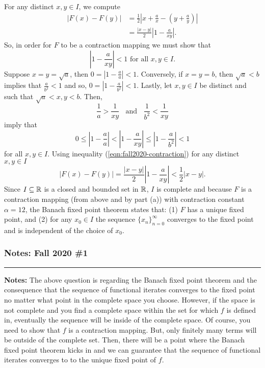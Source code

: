 \documentclass{article}
\begin{document}
For any distinct $x,y\in I$, we compute 
	\begin{align*}
		|F(x) - F(y)| & =\frac{1}{2} \left|x +\frac{a}{x} - \left(y +\frac{a}{y}\right)\right|\\
				  & = \frac{|x-y|}{2}\left|1 - \frac{a}{xy}\right|.
	\end{align*}
So, in order for $F$ to be a contraction mapping we must show that 
	\begin{equation}\label{eqn:fall2020-contraction}
		\left|1 - \frac{a}{xy}\right| < 1 \text{ for all } x,y\in I.
	\end{equation}
Suppose $x = y = \sqrt{a}$, then $0 = \left|1 - \frac{a}{a} \right| < 1$. Conversely, if $x = y = b$, then $\sqrt{a} < b$ implies that $\frac{a}{b^2} < 1$ and so, $0 = \left|1 - \frac{a}{b^2} \right| < 1$. Lastly, let $x,y\in I$ be distinct and such that $\sqrt{a} < x,y < b$. Then, 
	\begin{equation}\label{eqn:fall2020-inequality}
		\frac{1}{a} > \frac{1}{xy} \;\; \text{ and } \;\; \frac{1}{b^2} < \frac{1}{xy}
	\end{equation}
imply that 
\[ 0 \leq \left|1 - \frac{a}{a}\right| < \left|1 - \frac{a}{xy}\right|  \leq \left|1 - \frac{a}{b^2}\right| < 1 \]
for all $x,y\in I$. Using inequality (\ref{eqn:fall2020-contraction}) for any distinct $x,y\in I$
	\[ |F(x) - F(y)| = \frac{|x-y|}{2}\left|1 - \frac{a}{xy}\right| < \frac{1}{2}|x-y|.\]
Since $I\subseteq\mathbb R$ is a closed and bounded set in $\mathbb R$, $I$ is complete and because $F$ is a contraction mapping (from above and by part (a)) with contraction constant $\alpha = {1}{2}$, the Banach fixed point theorem states that: (1) $F$ has a unique fixed point, and (2) for any $x_0\in I$ the sequence $\{x_n\}_{n = 0}^\infty$ converges to the fixed point and is independent of the choice of $x_0$.

\break 

\subsubsection*{Notes: Fall 2020 \#1}

\hrule 

\textbf{Notes:} The above question is regarding the Banach fixed point theorem and the consequence that the sequence of functional iterates converges to the fixed point no matter what point in the complete space you choose. However, if the space is not complete and you find a complete space within the set for which $f$ is defined in, eventually the sequence will be inside of the complete space. Of course, you need to show that $f$ is a contraction mapping. But, only finitely many terms will be outside of the complete set. Then, there will be a point where the Banach fixed point theorem kicks in and we can guarantee that the sequence of functional iterates converges to to the unique fixed point of $f$.\\
\end{document}
